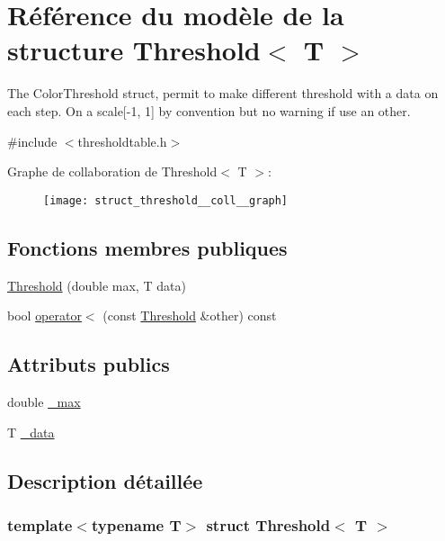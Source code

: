 \hypertarget{struct_threshold}{}\section{Référence du modèle de la structure Threshold$<$ T $>$}
\label{struct_threshold}


The Color\+Threshold struct, permit to make different threshold with a data on each step. On a scale\mbox{[}-\/1, 1\mbox{]} by convention but no warning if use an other.  




{\ttfamily \#include $<$thresholdtable.\+h$>$}



Graphe de collaboration de Threshold$<$ T $>$\+:\nopagebreak
\begin{figure}[H]
\begin{center}
\leavevmode
\texttt{[image: struct\_threshold\_\_coll\_\_graph]}
\end{center}
\end{figure}
\subsection*{Fonctions membres publiques}
\begin{DoxyCompactItemize}
\item 
\hyperlink{struct_threshold_acff40589799e19c56704bf23fa25cdf5}{Threshold} (double max, T data)
\item 
bool \hyperlink{struct_threshold_a40250fbaa1d32ec4992aa7bc32480f00}{operator$<$} (const \hyperlink{struct_threshold}{Threshold} \&other) const
\end{DoxyCompactItemize}
\subsection*{Attributs publics}
\begin{DoxyCompactItemize}
\item 
double \hyperlink{struct_threshold_a45ccfaf161df097939ca2014d990c41f}{\+\_\+max}
\item 
T \hyperlink{struct_threshold_ac2020d28bcb091ebfa9a6e967cc652a3}{\+\_\+data}
\end{DoxyCompactItemize}


\subsection{Description détaillée}
\subsubsection*{template$<$typename T$>$\newline
struct Threshold$<$ T $>$}


